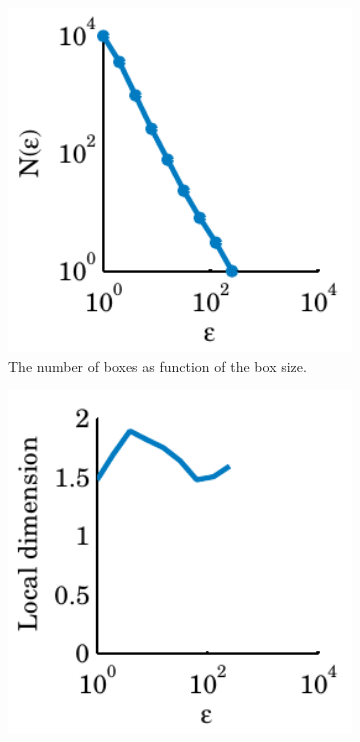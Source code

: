 \begin{figure}
\begin{subfigure}[t]{0.3\textwidth}
		\includegraphics[width=1\textwidth]{./img/assignment_fractal_numboxesVSboxsize}
		\caption{The number of boxes as function of the box size.}
		\label{fig:exp_fractal:fractalDimension}	
	\end{subfigure}	
	\begin{subfigure}[t]{0.3\textwidth}
		\centering
		\includegraphics[width=1\textwidth]{./img/assignment_fractal_gradient}

\end{subfigure}
\end{figure}
